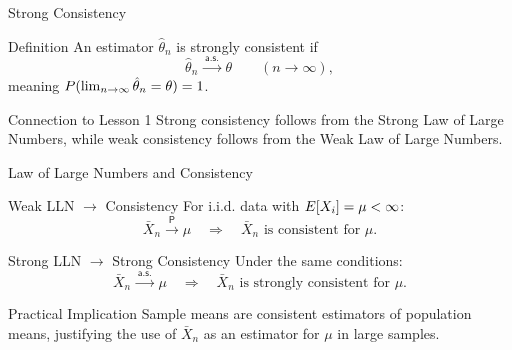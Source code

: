 \begin{frame}{Strong Consistency}
  \begin{block}{Definition}
    An estimator $\hat{\theta}_n$ is strongly consistent if
    \[\hat{\theta}_n \xrightarrow{\;\mathsf{a.s.}\;} \theta \qquad (n \to \infty),\]
    meaning $\P(\lim_{n\to\infty} \hat{\theta}_n = \theta) = 1$.
  \end{block}

  \begin{block}{Connection to Lesson 1}
    Strong consistency follows from the Strong Law of Large Numbers,
    while weak consistency follows from the Weak Law of Large Numbers.
  \end{block}
\end{frame}

\begin{frame}{Law of Large Numbers and Consistency}
  \begin{block}{Weak LLN $\to$ Consistency}
    For i.i.d. data with $\E[X_i] = \mu < \infty$:
    \[\bar{X}_n \xrightarrow{\;\mathsf{P}\;} \mu \quad \Rightarrow \quad \bar{X}_n \text{ is consistent for } \mu.\]
  \end{block}

  \begin{block}{Strong LLN $\to$ Strong Consistency}
    Under the same conditions:
    \[\bar{X}_n \xrightarrow{\;\mathsf{a.s.}\;} \mu \quad \Rightarrow \quad \bar{X}_n \text{ is strongly consistent for } \mu.\]
  \end{block}

  \begin{block}{Practical Implication}
    Sample means are consistent estimators of population means, justifying
    the use of $\bar{X}_n$ as an estimator for $\mu$ in large samples.
  \end{block}
\end{frame}

